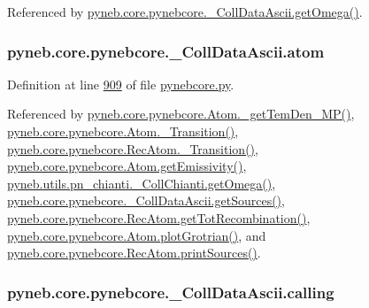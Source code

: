 Referenced by \hyperlink{pynebcore_8py_source_l01063}{pyneb.\+core.\+pynebcore.\+\_\+\+Coll\+Data\+Ascii.\+get\+Omega()}.

\hypertarget{classpyneb_1_1core_1_1pynebcore_1_1___coll_data_ascii_a47fdeb51513849a90f420296a0383d33}{}
\subsubsection[{atom}]{\setlength{\rightskip}{0pt plus 5cm}pyneb.\+core.\+pynebcore.\+\_\+\+Coll\+Data\+Ascii.\+atom}\label{classpyneb_1_1core_1_1pynebcore_1_1___coll_data_ascii_a47fdeb51513849a90f420296a0383d33}


Definition at line \hyperlink{pynebcore_8py_source_l00909}{909} of file \hyperlink{pynebcore_8py_source}{pynebcore.\+py}.



Referenced by \hyperlink{pynebcore_8py_source_l01980}{pyneb.\+core.\+pynebcore.\+Atom.\+\_\+get\+Tem\+Den\+\_\+\+M\+P()}, \hyperlink{pynebcore_8py_source_l01367}{pyneb.\+core.\+pynebcore.\+Atom.\+\_\+\+Transition()}, \hyperlink{pynebcore_8py_source_l02696}{pyneb.\+core.\+pynebcore.\+Rec\+Atom.\+\_\+\+Transition()}, \hyperlink{pynebcore_8py_source_l01716}{pyneb.\+core.\+pynebcore.\+Atom.\+get\+Emissivity()}, \hyperlink{pn__chianti_8py_source_l00484}{pyneb.\+utils.\+pn\+\_\+chianti.\+\_\+\+Coll\+Chianti.\+get\+Omega()}, \hyperlink{pynebcore_8py_source_l01003}{pyneb.\+core.\+pynebcore.\+\_\+\+Coll\+Data\+Ascii.\+get\+Sources()}, \hyperlink{pynebcore_8py_source_l02735}{pyneb.\+core.\+pynebcore.\+Rec\+Atom.\+get\+Tot\+Recombination()}, \hyperlink{pynebcore_8py_source_l02372}{pyneb.\+core.\+pynebcore.\+Atom.\+plot\+Grotrian()}, and \hyperlink{pynebcore_8py_source_l02796}{pyneb.\+core.\+pynebcore.\+Rec\+Atom.\+print\+Sources()}.

\hypertarget{classpyneb_1_1core_1_1pynebcore_1_1___coll_data_ascii_a08efc5898f4e03a1b7702d85f909e188}{}
\subsubsection[{calling}]{\setlength{\rightskip}{0pt plus 5cm}pyneb.\+core.\+pynebcore.\+\_\+\+Coll\+Data\+Ascii.\+calling}\label{classpyneb_1_1core_1_1pynebcore_1_1___coll_data_ascii_a08efc5898f4e03a1b7702d85f909e188}


